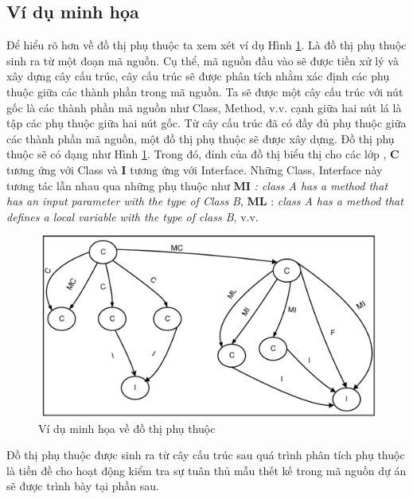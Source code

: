 \documentclass[12pt]{report}
\begin{document}
\subsection{Ví dụ minh họa}
\noindent Để hiểu rõ hơn về đồ thị phụ thuộc ta xem xét ví dụ Hình \ref{fig:example_graph_dependency}. Là đồ thị phụ thuộc sinh ra từ một đoạn mã nguồn. Cụ thể, mã nguồn đầu vào sẽ được tiền xử lý và xây dựng cây cấu trúc, cây cấu trúc sẽ được phân tích nhằm xác định các phụ thuộc giữa các thành phần trong mã nguồn. Ta sẽ được một cây cấu trúc với nút gốc là các thành phần mã nguồn như Class, Method, v.v. cạnh giữa hai nút lá là tập các phụ thuộc giữa hai nút gốc. Từ cây cấu trúc đã có đầy đủ phụ thuộc giữa các thành phần mã nguồn, một đồ thị phụ thuộc sẽ được xây dựng. Đồ thị phụ thuộc sẽ có dạng như Hình \ref{fig:example_graph_dependency}.
Trong đó, đỉnh của đồ thị biểu thị cho các lớp , \textbf{C} tương ứng với Class và \textbf{I} tương ứng với Interface. Những Class, Interface này tương tác lẫn nhau qua những phụ thuộc như \textbf{MI} \textit{: class A has a method that has an input parameter with the type of Class B}, \textbf{ML} : \textit{class A has a method that defines a local variable with the type of class B}, v.v.\\
\begin{figure}[!htbp]
	\centering
	\vspace{-0.5cm}
	\includegraphics[scale=0.9]{images/dependency_graph.pdf}
	\vspace{-0.5cm}
	\caption{Ví dụ minh họa về đồ thị phụ thuộc}
	\label{fig:example_graph_dependency}
\end{figure}

\noindent Đồ thị phụ thuộc được sinh ra từ cây cấu trúc sau quá trình phân tích phụ thuộc là tiền đề cho hoạt động kiểm tra sự tuân thủ mẫu thết kế trong mã nguồn dự án sẽ được trình bày tại phần sau.
\end{document}
